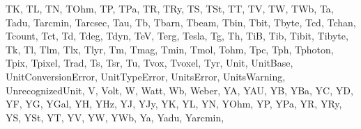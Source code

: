 \documentclass[letterpaper,10pt,english]{sphinxmanual}
\begin{document}
\begin{sphinxVerbatim}[commandchars=\\\{\}]
 \PYGZsq{}TK\PYGZsq{},
 \PYGZsq{}TL\PYGZsq{},
 \PYGZsq{}TN\PYGZsq{},
 \PYGZsq{}TOhm\PYGZsq{},
 \PYGZsq{}TP\PYGZsq{},
 \PYGZsq{}TPa\PYGZsq{},
 \PYGZsq{}TR\PYGZsq{},
 \PYGZsq{}TRy\PYGZsq{},
 \PYGZsq{}TS\PYGZsq{},
 \PYGZsq{}TSt\PYGZsq{},
 \PYGZsq{}TT\PYGZsq{},
 \PYGZsq{}TV\PYGZsq{},
 \PYGZsq{}TW\PYGZsq{},
 \PYGZsq{}TWb\PYGZsq{},
 \PYGZsq{}Ta\PYGZsq{},
 \PYGZsq{}Tadu\PYGZsq{},
 \PYGZsq{}Tarcmin\PYGZsq{},
 \PYGZsq{}Tarcsec\PYGZsq{},
 \PYGZsq{}Tau\PYGZsq{},
 \PYGZsq{}Tb\PYGZsq{},
 \PYGZsq{}Tbarn\PYGZsq{},
 \PYGZsq{}Tbeam\PYGZsq{},
 \PYGZsq{}Tbin\PYGZsq{},
 \PYGZsq{}Tbit\PYGZsq{},
 \PYGZsq{}Tbyte\PYGZsq{},
 \PYGZsq{}Tcd\PYGZsq{},
 \PYGZsq{}Tchan\PYGZsq{},
 \PYGZsq{}Tcount\PYGZsq{},
 \PYGZsq{}Tct\PYGZsq{},
 \PYGZsq{}Td\PYGZsq{},
 \PYGZsq{}Tdeg\PYGZsq{},
 \PYGZsq{}Tdyn\PYGZsq{},
 \PYGZsq{}TeV\PYGZsq{},
 \PYGZsq{}Terg\PYGZsq{},
 \PYGZsq{}Tesla\PYGZsq{},
 \PYGZsq{}Tg\PYGZsq{},
 \PYGZsq{}Th\PYGZsq{},
 \PYGZsq{}TiB\PYGZsq{},
 \PYGZsq{}Tib\PYGZsq{},
 \PYGZsq{}Tibit\PYGZsq{},
 \PYGZsq{}Tibyte\PYGZsq{},
 \PYGZsq{}Tk\PYGZsq{},
 \PYGZsq{}Tl\PYGZsq{},
 \PYGZsq{}Tlm\PYGZsq{},
 \PYGZsq{}Tlx\PYGZsq{},
 \PYGZsq{}Tlyr\PYGZsq{},
 \PYGZsq{}Tm\PYGZsq{},
 \PYGZsq{}Tmag\PYGZsq{},
 \PYGZsq{}Tmin\PYGZsq{},
 \PYGZsq{}Tmol\PYGZsq{},
 \PYGZsq{}Tohm\PYGZsq{},
 \PYGZsq{}Tpc\PYGZsq{},
 \PYGZsq{}Tph\PYGZsq{},
 \PYGZsq{}Tphoton\PYGZsq{},
 \PYGZsq{}Tpix\PYGZsq{},
 \PYGZsq{}Tpixel\PYGZsq{},
 \PYGZsq{}Trad\PYGZsq{},
 \PYGZsq{}Ts\PYGZsq{},
 \PYGZsq{}Tsr\PYGZsq{},
 \PYGZsq{}Tu\PYGZsq{},
 \PYGZsq{}Tvox\PYGZsq{},
 \PYGZsq{}Tvoxel\PYGZsq{},
 \PYGZsq{}Tyr\PYGZsq{},
 \PYGZsq{}Unit\PYGZsq{},
 \PYGZsq{}UnitBase\PYGZsq{},
 \PYGZsq{}UnitConversionError\PYGZsq{},
 \PYGZsq{}UnitTypeError\PYGZsq{},
 \PYGZsq{}UnitsError\PYGZsq{},
 \PYGZsq{}UnitsWarning\PYGZsq{},
 \PYGZsq{}UnrecognizedUnit\PYGZsq{},
 \PYGZsq{}V\PYGZsq{},
 \PYGZsq{}Volt\PYGZsq{},
 \PYGZsq{}W\PYGZsq{},
 \PYGZsq{}Watt\PYGZsq{},
 \PYGZsq{}Wb\PYGZsq{},
 \PYGZsq{}Weber\PYGZsq{},
 \PYGZsq{}YA\PYGZsq{},
 \PYGZsq{}YAU\PYGZsq{},
 \PYGZsq{}YB\PYGZsq{},
 \PYGZsq{}YBa\PYGZsq{},
 \PYGZsq{}YC\PYGZsq{},
 \PYGZsq{}YD\PYGZsq{},
 \PYGZsq{}YF\PYGZsq{},
 \PYGZsq{}YG\PYGZsq{},
 \PYGZsq{}YGal\PYGZsq{},
 \PYGZsq{}YH\PYGZsq{},
 \PYGZsq{}YHz\PYGZsq{},
 \PYGZsq{}YJ\PYGZsq{},
 \PYGZsq{}YJy\PYGZsq{},
 \PYGZsq{}YK\PYGZsq{},
 \PYGZsq{}YL\PYGZsq{},
 \PYGZsq{}YN\PYGZsq{},
 \PYGZsq{}YOhm\PYGZsq{},
 \PYGZsq{}YP\PYGZsq{},
 \PYGZsq{}YPa\PYGZsq{},
 \PYGZsq{}YR\PYGZsq{},
 \PYGZsq{}YRy\PYGZsq{},
 \PYGZsq{}YS\PYGZsq{},
 \PYGZsq{}YSt\PYGZsq{},
 \PYGZsq{}YT\PYGZsq{},
 \PYGZsq{}YV\PYGZsq{},
 \PYGZsq{}YW\PYGZsq{},
 \PYGZsq{}YWb\PYGZsq{},
 \PYGZsq{}Ya\PYGZsq{},
 \PYGZsq{}Yadu\PYGZsq{},
 \PYGZsq{}Yarcmin\PYGZsq{},

\end{sphinxVerbatim}
\end{document}
